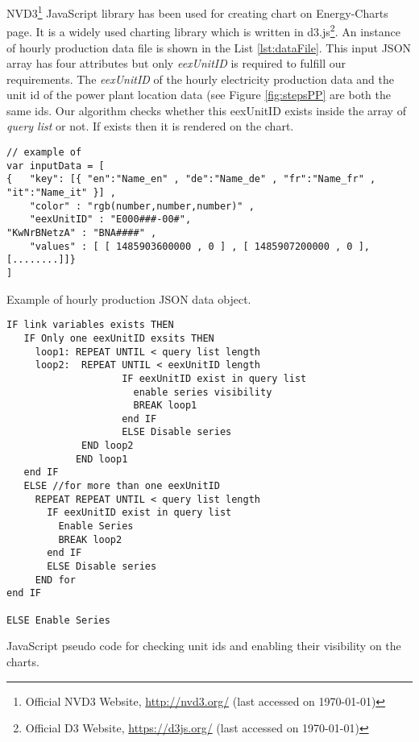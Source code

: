 NVD3\footnote{Official NVD3 Website, \url{http://nvd3.org/} (last accessed on \today)} JavaScript library has been used for creating chart on Energy-Charts page. It is a widely used charting library which is written in d3.js\footnote{Official D3 Website, \url{https://d3js.org/} (last accessed on \today)}. An instance of hourly production data file is shown in the List \ref{lst:dataFile}. This input JSON array has four attributes but only \textit{eexUnitID} is required to fulfill our requirements. The \textit{eexUnitID} of the hourly electricity production data and the unit id of the power plant location data (see Figure \ref{fig:stepsPP} are both the same ids. Our algorithm checks whether this eexUnitID exists inside the array of \textit{query list} or not. If exists then it is rendered on the chart. %

\begin{Listing} [H]
\begin{lstlisting}
// example of 
var inputData = [
{	"key": [{ "en":"Name_en" , "de":"Name_de" , "fr":"Name_fr" , "it":"Name_it" }] ,
	"color" : "rgb(number,number,number)" ,
	"eexUnitID" : "E000###-00#",
"KwNrBNetzA" : "BNA####" ,
	"values" : [ [ 1485903600000 , 0 ] , [ 1485907200000 , 0 ], [........]]}
]

\end{lstlisting}
\caption{Example of hourly production JSON data object.}
\label{lst:dataFile}
\end{Listing}

\begin{Listing} [H]
\begin{lstlisting}
IF link variables exists THEN
   IF Only one eexUnitID exsits THEN
     loop1: REPEAT UNTIL < query list length
     loop2:  REPEAT UNTIL < eexUnitID length
					IF eexUnitID exist in query list
        	          enable series visibility 
                	  BREAK loop1
                	end IF
					ELSE Disable series
			 END loop2
		    END loop1
   end IF
   ELSE //for more than one eexUnitID
     REPEAT REPEAT UNTIL < query list length
       IF eexUnitID exist in query list
         Enable Series
         BREAK loop2
       end IF
       ELSE Disable series
     END for
end IF

ELSE Enable Series
\end{lstlisting}
\caption[pseudo code for checking unit ids]{JavaScript pseudo code for checking unit ids and enabling their visibility on the charts.}
\label{lst:algo}
\end{Listing}

